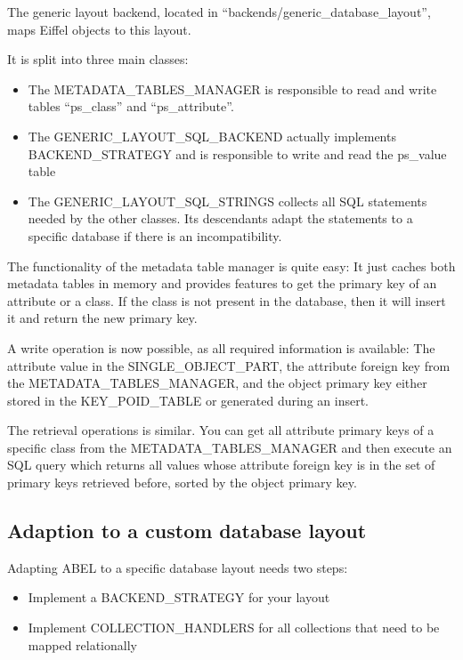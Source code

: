 The generic layout backend, located in ``backends/generic\_database\_layout'', maps Eiffel objects to this layout.

It is split into three main classes:
\begin{itemize}
 \item The METADATA\_TABLES\_MANAGER is responsible to read and write tables ``ps\_class'' and ``ps\_attribute''.
 \item The GENERIC\_LAYOUT\_SQL\_BACKEND actually implements BACKEND\_STRATEGY and is responsible to write and read the ps\_value table
 \item The GENERIC\_LAYOUT\_SQL\_STRINGS collects all SQL statements needed by the other classes. Its descendants adapt the statements to a specific database if there is an incompatibility.
\end{itemize}

The functionality of the metadata table manager is quite easy:
It just caches both metadata tables in memory and provides features to get the primary key of an attribute or a class.
If the class is not present in the database, then it will insert it and return the new primary key.

A write operation is now possible, as all required information is available: 
The attribute value in the SINGLE\_OBJECT\_PART, the attribute foreign key from the METADATA\_TABLES\_MANAGER, and the object primary key either stored in the KEY\_POID\_TABLE or generated during an insert.

The retrieval operations is similar.
You can get all attribute primary keys of a specific class from the METADATA\_TABLES\_MANAGER and then execute an SQL query which returns all values whose attribute foreign key is in the set of primary keys retrieved before, sorted by the object primary key.


\subsection{Adaption to a custom database layout}
\label{subsection:specific_adaption}

Adapting ABEL to a specific database layout needs two steps:
 \begin{itemize}
  \item Implement a BACKEND\_STRATEGY for your layout
  \item Implement COLLECTION\_HANDLERS for all collections that need to be mapped relationally
 \end{itemize}

